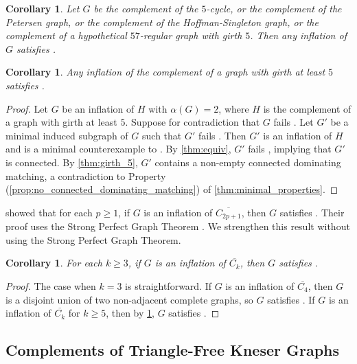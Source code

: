 \documentclass[11pt]{article}
\numberwithin{equation}{section}
\theoremstyle{plain}
\newtheorem{cor}[equation]{Corollary}
\theoremstyle{definition}
\renewcommand{\geq}{\geqslant}
\newcommand{\propref}[1]{\textup{(\ref{#1})}}
\begin{document}
\begin{cor}
    \label{thm:girth_5_eg}
    Let $G$ be the complement of the $5$-cycle, or the complement of the Petersen graph, or the complement of the Hoffman-Singleton graph, or the complement of a hypothetical $57$-regular graph with girth $5$. Then any inflation of $G$ satisfies .
\end{cor}

\begin{cor}
    \label{thm:girth_5_hc}
    Any inflation of the complement of a graph with girth at least $5$ satisfies .
\end{cor}
\begin{proof}
    Let $G$ be an inflation of $H$ with $\alpha(G) = 2$, where $H$ is the complement of a graph with girth at least $5$. Suppose for contradiction that $G$ fails . Let $G'$ be a minimal induced subgraph of $G$ such that $G'$ fails . Then $G'$ is an inflation of $H$ and is a minimal counterexample to . By \cref{thm:equiv}, $G'$ fails , implying that $G'$ is connected. By \cref{thm:girth_5}, $G'$ contains a non-empty connected dominating matching, a contradiction to Property \propref{prop:no_connected_dominating_matching} of \cref{thm:minimal_properties}.
\end{proof}

\citet{PPT16} showed that for each $p \geq 1$, if $G$ is an inflation of $\overline{C_{2p+1}}$, then $G$ satisfies . Their proof uses the Strong Perfect Graph Theorem \citep{CRST-AM06}. We strengthen this result without using the Strong Perfect Graph Theorem.
\begin{cor}
    \label{cor:anticycles}
    For each $k \geq 3$, if $G$ is an inflation of $\overline{C_k}$, then $G$ satisfies .
\end{cor}
\begin{proof}
    The case when $k = 3$ is straightforward.
    If $G$ is an inflation of $\overline{C_4}$, then $G$ is a disjoint union of two non-adjacent complete graphs, so $G$ satisfies . If $G$ is an inflation of $\overline{C_k}$ for $k \geq 5$, then by \cref{thm:girth_5_hc}, $G$ satisfies .
\end{proof}

\subsection{Complements of Triangle-Free Kneser Graphs}
\label{ss:kneser_graphs}
\end{document}

